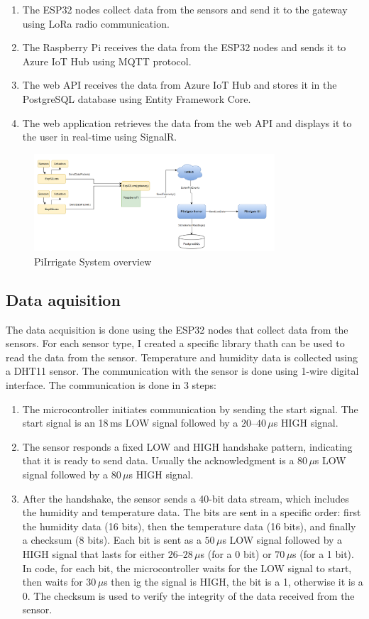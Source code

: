 \begin{enumerate}
  \item The ESP32 nodes collect data from the sensors and send it to the gateway using LoRa radio communication.
  \item The Raspberry Pi receives the data from the ESP32 nodes and sends it to Azure IoT Hub using MQTT protocol.
  \item The web API receives the data from Azure IoT Hub and stores it in the PostgreSQL database using Entity Framework Core. 
  \item The web application retrieves the data from the web API and displays it to the user in real-time using SignalR.
\end{enumerate}
\begin{figure}[H]
    \centering
    \includegraphics[width=0.8\textwidth]{images/system.png}
    \caption{PiIrrigate System overview}
    \label{fig:system-overview}
\end{figure}

\subsection{Data aquisition}
The data acquisition is done using the ESP32 nodes that collect data from the sensors.
For each sensor type, I created a specific library thath can be used to read the data from the sensor.
Temperature and humidity data is collected using a DHT11 sensor. The communication with the sensor is done using
1-wire digital interface. The communication is done in 3 steps\cite{1wire}:
\begin{enumerate}
  \item The microcontroller initiates communication by sending the start signal.
  The start signal is an 18\,ms LOW signal followed by a $20$--$40\,\mu$s HIGH signal.
  \item The sensor responds a fixed LOW and HIGH handshake pattern, indicating that it is ready to send data.
  Usually the acknowledgment is a $80\,\mu$s LOW signal followed by a $80\,\mu$s HIGH signal.
  \item After the handshake, the sensor sends a 40-bit data stream, which includes the humidity and temperature data.
  The bits are sent in a specific order: first the humidity data (16 bits), 
  then the temperature data (16 bits), 
  and finally a checksum (8 bits).
  Each bit is sent as a $50\,\mu$s LOW signal followed by a HIGH signal that lasts for either $26$--$28\,\mu$s (for a 0 bit) or $70\,\mu$s (for a 1 bit).
  In code, for each bit, the microcontroller waits for the LOW signal to start, 
  then waits for $30\,\mu$s then ig the signal is HIGH, the bit is a 1, otherwise it is a 0.
  The checksum is used to verify the integrity of the data received from the sensor.
\end{enumerate}

